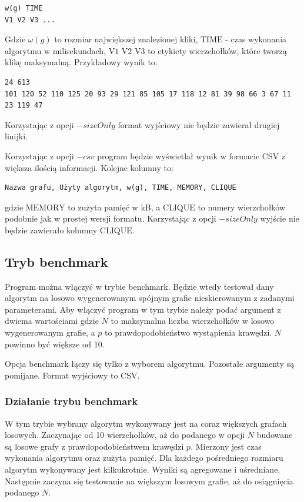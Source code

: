 \documentclass[12pt, a4paper]{article}
\begin{document}
\begin{verbatim}
w(g) TIME
V1 V2 V3 ...
\end{verbatim}
Gdzie $\omega(g)$ to rozmiar największej znalezionej kliki, $\text{TIME}$ - czas wykonania algorytmu w milisekundach, $\text{V1 V2 V3}$ to etykiety wierzchołków, które tworzą klikę maksymalną. Przykładowy wynik to:

\begin{verbatim}
24 613
101 120 52 110 125 20 93 29 121 85 105 17 118 12 81 39 98 66 3 67 11 23 119 47
\end{verbatim}

Korzystając z opcji $-sizeOnly$ format wyjściowy nie będzie zawierał drugiej linijki. 

Korzystając z opcji $-csv$ program będzie wyświetlał wynik w formacie CSV z większa ilością informacji. Kolejne kolumny to:
\begin{verbatim}
Nazwa grafu, Użyty algorytm, w(g), TIME, MEMORY, CLIQUE
\end{verbatim}

gdzie $\text{MEMORY}$ to zużyta pamięć w kB, a $\text{CLIQUE}$ to numery wierzchołków podobnie jak w prostej wersji formatu. Korzystając z opcji $-sizeOnly$ wyjście nie będzie zawierało kolumny $\text{CLIQUE}$.

\subsection{Tryb benchmark}
Program można włączyć w trybie benchmark. Będzie wtedy testował dany algorytm na losowo wygenerowanym spójnym grafie nieskierowanym z zadanymi parameterami. Aby włączyć program w tym trybie należy podać argument z dwiema wartościami \emph{} gdzie $N$ to maksymalna liczba wierzchołków w losowo wygenerowanym grafie, a $p$ to prawdopodobieństwo wystąpienia krawędzi. $N$ powinno być większe od 10.

Opcja benchmark łączy się tylko z wyborem algorytmu. Pozostałe argumenty są pomijane. Format wyjściowy to CSV.

\subsubsection{Działanie trybu benchmark}
W tym trybie wybrany algorytm wykonywany jest na coraz większych grafach losowych. Zaczynając od 10 wierzchołków, aż do podanego w opcji $N$ budowane są losowe grafy z prawdopodobieństwem krawędzi $p$. Mierzony jest czas wykonania algorytmu oraz zużyta pamięć. Dla każdego pośredniego rozmiaru algorytm wykonywany jest kilkukrotnie. Wyniki są agregowane i uśredniane. Następnie zaczyna się testowanie na większym losowym grafie, aż do osiągnięcia podanego $N$.
\end{document}
